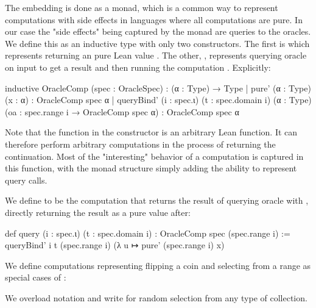 The embedding is done as a monad, which is a common way to represent computations with side effects in languages where all computations are pure.
In our case the "side effects" being captured by the monad are queries to the oracles.  We define this as an inductive type with only two constructors.
The first is  which represents returning an pure Lean value .
The other, , represents querying oracle  on input  to get a result  and then running the computation .  Explicitly:
\begin{leancode}
  inductive OracleComp (spec : OracleSpec) : (α : Type) → Type
    | pure' (α : Type) (x : α) : OracleComp spec α
    | queryBind' (i : spec.ι) (t : spec.domain i)
        (α : Type) (oa : spec.range i → OracleComp spec α) :
        OracleComp spec α
\end{leancode}
Note that the function  in the  constructor is an arbitrary Lean function.
It can therefore perform arbitrary computations in the process of returning the continuation.
Most of the "interesting" behavior of a computation is captured in this function, with the monad structure simply adding the ability to represent query calls.

We define  to be the computation that returns the result of querying oracle  with , directly returning the result as a pure value after:
\begin{leancode}
  def query (i : spec.ι) (t : spec.domain i) :
    OracleComp spec (spec.range i) :=
    queryBind' i t (spec.range i) (λ u ↦ pure' (spec.range i) x)
\end{leancode}
We define computations representing flipping a coin and selecting from a range as special cases of :
We overload notation and write  for random selection from any type of collection.

